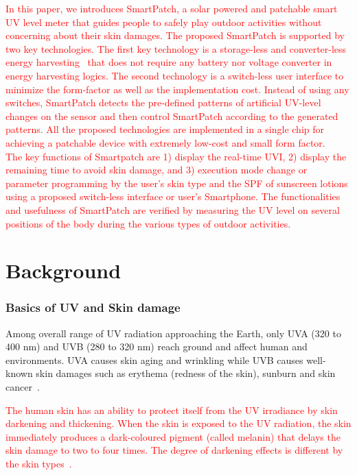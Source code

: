 \documentclass[journal]{IEEEtran}
\begin{document}
\textcolor{red}{In this paper, we introduces SmartPatch, a solar powered  and patchable smart UV level meter that guides people to safely play outdoor activities without concerning about their skin damages. The proposed SmartPatch is supported by two key technologies. The first key technology is a storage-less and converter-less energy harvesting~\cite{Lee:ASPDAC15} that does not require any battery nor voltage converter in energy harvesting logics. The second technology is a switch-less user interface to minimize the form-factor as well as the implementation cost. Instead of using any switches, SmartPatch detects the pre-defined patterns of artificial UV-level changes on the sensor and then control SmartPatch according to the generated patterns. All the proposed technologies are implemented in a single chip for achieving a patchable device with extremely low-cost and small form factor.\\
% 
The key functions of Smartpatch are 1) display the real-time UVI, 2) display the remaining time to avoid skin damage, and 3) execution mode change or parameter programming by the user's skin type and the SPF of sunscreen lotions using a proposed switch-less interface or user's Smartphone. The functionalities and usefulness of SmartPatch are verified by measuring the UV level on several positions of the body during the various types of outdoor activities.}

\section{Background}
\subsubsection{Basics of UV and Skin damage}

Among overall range of UV radiation approaching the Earth, only UVA (320 to 400 nm) and UVB (280 to 320 nm) reach ground and affect human and environments. UVA causes skin aging and wrinkling while UVB causes well-known skin damages such as erythema (redness of the skin), sunburn and skin cancer~\cite{Matsumura:TAP04}.

\textcolor{red}{The human skin has an ability to protect itself from the UV irradiance by skin darkening and thickening.
When the skin is exposed to the UV radiation, the skin immediately produces a dark-coloured pigment (called melanin) that delays the skin damage to two to four times. The degree of darkening effects is different by the skin types~\cite{Harrison:Method02}.}
\end{document}
